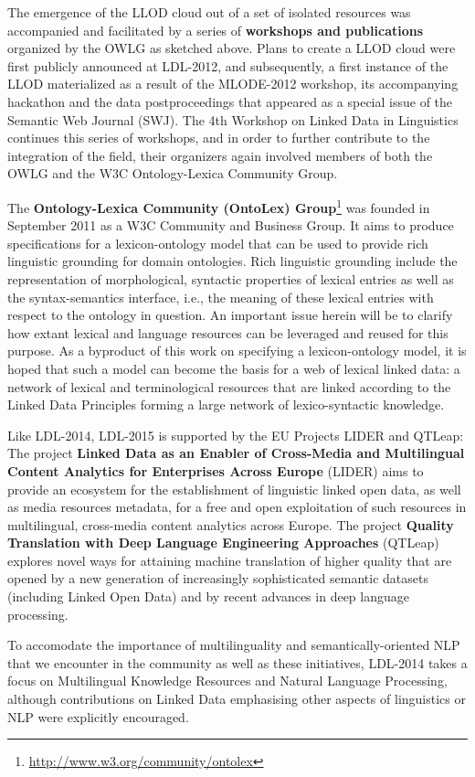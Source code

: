 The emergence of the LLOD cloud out of a set of isolated resources was accompanied and facilitated by a series of \textbf{workshops and publications} organized by the OWLG as sketched above. 
Plans to create a LLOD cloud were first publicly announced at LDL-2012, and subsequently, a first instance of the LLOD materialized as a result of the MLODE-2012 workshop, its accompanying hackathon and the data postproceedings that appeared as a special issue of the Semantic Web Journal (SWJ). 
The 4th Workshop on Linked Data in Linguistics continues this series of workshops, and in order to further contribute to the integration of the field, their organizers again involved members of both the OWLG and the W3C Ontology-Lexica Community Group.

The \textbf{Ontology-Lexica Community (OntoLex) Group}\footnote{\url{http://www.w3.org/community/ontolex}} was founded  in September 2011 as a W3C Community and Business Group. It aims to produce specifications for a lexicon-ontology model that can be used to provide rich linguistic grounding for domain ontologies.
Rich linguistic grounding include the representation of morphological, syntactic properties of lexical entries as well as the syntax-semantics interface, i.e., the meaning of these lexical entries with respect to the ontology in question. An important issue herein will be to clarify how extant lexical and language resources can be leveraged and reused for this purpose. As a byproduct of this work on specifying a lexicon-ontology model, it is hoped that such a model can become the basis for a web of lexical linked data: a network of lexical and terminological resources that are linked according to the Linked Data Principles forming a large network of lexico-syntactic knowledge.

Like LDL-2014, LDL-2015 is supported by the EU Projects LIDER and QTLeap:
The project \textbf{Linked Data as an Enabler of Cross-Media and Multilingual Content Analytics for Enterprises Across Europe} (LIDER) aims to provide an 
ecosystem for the establishment of linguistic linked open data, as well as media resources metadata, for a free and open exploitation of such resources in 
multilingual, cross-media content analytics across Europe. 
The project \textbf{Quality Translation with Deep Language Engineering Approaches} (QTLeap) explores novel ways for attaining machine translation of higher quality that are opened by a new generation of increasingly sophisticated semantic datasets (including Linked Open Data) and by recent advances in deep language processing.

To accomodate the importance of multilinguality and semantically-oriented NLP that we encounter in the community as well as these initiatives, LDL-2014 takes a focus on Multilingual Knowledge Resources and Natural Language Processing, although contributions on Linked Data emphasising other aspects of linguistics or NLP were explicitly encouraged.
